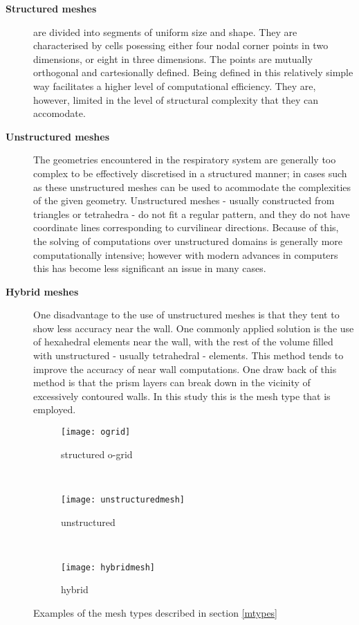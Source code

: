 \begin{description}
  \item[\textbf{Structured meshes}]
    are divided into segments of uniform size and shape. They are characterised by cells posessing either four nodal corner points in two dimensions, or eight in three dimensions. The points are mutually orthogonal and cartesionally defined. Being defined in this relatively simple way facilitates a higher level of computational efficiency. They are, however, limited in the level of structural complexity that they can accomodate.

  \item[\textbf{Unstructured meshes}] 
    The geometries encountered in the respiratory system are generally too complex to be effectively discretised in a structured manner; in cases such as these unstructured meshes can be used to acommodate the complexities of the given geometry. Unstructured meshes - usually constructed from triangles or tetrahedra - do not fit a regular pattern, and they do not have coordinate lines corresponding to curvilinear directions. Because of this, the solving of computations over unstructured domains is generally more computationally intensive; however with modern advances in computers this has become less significant an issue in many cases.

  \item[\textbf{Hybrid meshes}] 
    One disadvantage to the use of unstructured meshes is that they tent to show less accuracy near the wall. One commonly applied solution is the use of hexahedral elements near the wall, with the rest of the volume filled with unstructured - usually tetrahedral - elements. This method tends to improve the accuracy of near wall computations. One draw back of this method is that the prism layers can break down in the vicinity of excessively contoured walls. In this study this is the mesh type that is employed.

\end{description}

\begin{figure}
  \begin{subfigure}[t]{0.3\textwidth}
    \texttt{[image: ogrid]}
      \caption{structured o-grid}
    \label{strucmesh}
  \end{subfigure}%
  ~%
  \begin{subfigure}[t]{0.3\textwidth}
    \texttt{[image: unstructuredmesh]}
    \caption{unstructured}
    \label{unstrucmesh}
  \end{subfigure}%
  ~%
  \begin{subfigure}[t]{0.3\textwidth}
    \texttt{[image: hybridmesh]}
    \caption{hybrid}
    \label{unstrucmesh}
  \end{subfigure}

  \caption{Examples of the mesh types described in section \ref{mtypes}} 
  \label{fig:struct}
\end{figure}

